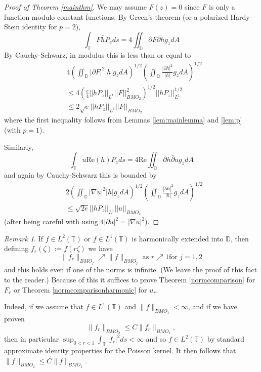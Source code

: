 \documentclass[12pt]{amsart}
\theoremstyle{definition}
\theoremstyle{remark}
\newtheorem{remark}[theorem]{Remark}
\numberwithin{equation}{section}
\newcommand{\D}{\mathbb{D}}
\newcommand{\T}{\mathbb{T}}
\begin{document}
\begin{proof}[Proof of Theorem \ref{mainthm}]

We may assume $F(z)=0$ since $F$ is only a function modulo constant
functions.  By Green's theorem (or a polarized Hardy-Stein identity
for $p=2$),
\[
\int_{\T} F \bar{h} P_z ds = 4 \iint_{\D} \partial F \overline{\partial h} g_z dA
\]
By Cauchy-Schwarz, in modulus this is less than or equal to
\[
\begin{aligned}
&4 \left( \iint_{\D} |\partial F|^2 |h| g_z dA
\right)^{1/2} \left( \iint_{\D} \frac{|\partial h|^2}{|h|} g_z dA \right)^{1/2} \\
& \leq 4 \left(\frac{e}{4} ||h P_z ||_{L^1} ||F||^2_{BMO_2} \right)^{1/2}
||h P_z||^{1/2}_{L^1} \\
& \leq 2\sqrt{e} ||h P_z||_{L^1} ||F||_{BMO_2}
\end{aligned}
\]
where the first inequality follows from Lemmas \ref{lem:mainlemma} and
\ref{lem:p} (with $p=1$).

Similarly,
\[
\int_{\T} u \text{Re}(h) P_z ds = 4 \text{Re} \iint_{\D} \partial h
\bar{\partial} u g_z dA
\]
and again by Cauchy-Schwarz this is bounded by
\[
\begin{aligned}
&2 \left( \iint_{\D} |\nabla u|^2 |h| g_z dA
\right)^{1/2} \left( \iint_{\D} \frac{|\partial h|^2}{|h|} g_z dA \right)^{1/2} \\
& \leq \sqrt{2e} ||h P_z||_{L^1} ||u||_{BMO_2}
\end{aligned}
\]
(after being careful with using $4|\partial u|^2 = |\nabla u|^2$).

\end{proof}

\begin{remark} \label{slicesremark}
If $f\in L^2(\T)$ or $f\in L^1(\T)$ is harmonically extended into
$\D$, then defining $f_r(\zeta) := f(r\zeta)$ we have
\[
\|f_r\|_{BMO_j} \nearrow \|f\|_{BMO_j} \text{ as } r \nearrow 1 \text{
  for } j =1,2
\]
and this holds even if one of the norms is infinite. (We leave the
proof of this fact to the reader.)  Because of this it suffices to
prove Theorem \ref{normcomparison} for $F_r$ or Theorem
\ref{normcomparisonharmonic} for $u_r$.

Indeed, if we assume that $f \in L^1(\T)$ and $\|f\|_{BMO_1} <
\infty$, and if we have proven
\[
\|f_r\|_{BMO_2} \leq C\|f_r\|_{BMO_1}, 
\]
 then in particular $\sup_{0<r<1} \int_{\T}|f_r|^2ds < \infty$ and so
 $f\in L^2(\T)$ by standard approximate identity properties for the
 Poisson kernel. It then follows that $\|f\|_{BMO_2} \leq
 C\|f\|_{BMO_1}$.
\end{remark}
\end{document}
